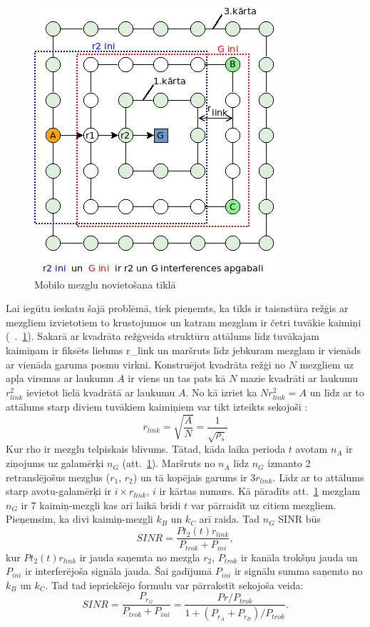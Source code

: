 \begin{figure}[ht!]
 \centering
\includegraphics[scale=0.6]{./graph/tier.png}
\caption{Mobilo mezglu novietošana tīklā}
\label{fig:topo}
\end{figure}

Lai iegūtu ieskatu šajā problēmā, tiek pieņemts, ka tīkls ir taisnstūra režģis ar mezgliem izvietotiem to krustojumos un katram mezglam ir četri tuvākie kaimiņi (\seename~\figurename.~\ref{fig:topo}). Sakarā ar kvadrāta režģveida struktūru attālums līdz tuvākajam kaimiņam  ir fiksēts lielums \gls{r_link}  un maršruts līdz jebkuram mezglam ir vienāds ar vienāda garuma posmu virkni. Konstruējot kvadrāta režģi no $N$ mezgliem uz apļa virsmas ar laukumu $A$ ir viens un tas pats kā $N$ mazie kvadrāti ar laukumu $r_{link}^{2}$ ievietot lielā kvadrātā  ar laukumu $A$. No kā izriet ka $Nr_{link}^{2} = A$ un līdz ar to attālums starp diviem tuvākiem kaimiņiem var tikt izteikts sekojoši \cite{qoS_mobility}:
\begin{equation}
r_{link}=\sqrt{\frac{A}{N}}=\frac{1}{\sqrt{\rho_{s}}}
\label{eq:rlink}
\end{equation}
Kur \gls{rho} ir mezglu telpiskais blīvums. Tātad, kāda laika perioda $t$ avotam $n_{A}$ ir ziņojums uz galamērķi $n_{G}$ (att.~\ref{fig:topo}). Maršruts no $n_{A}$ līdz $n_{G}$ izmanto 2 retranslējošus mezglus ($r_{1}$, $r_{2}$) un tā kopējais garums ir 3$r_{link}$. Līdz ar to attālums starp avotu-galamērķi ir $i\times r_{link}$, $i$ ir kārtas numurs. Kā pāradīts att.~\ref{fig:topo} mezglam $n_{G}$ ir 7 kaimiņ-mezgli kas arī laikā brīdi $t$ var pārraidīt uz citiem mezgliem. Pieņemsim, ka divi kaimiņ-mezgli $k_{B}$ un $k_{C}$ arī raida. Tad $n_{G}$ SINR būs
\begin{equation}
SINR=\frac{Pt_{2}(t)r_{link}}{P_{trok}+P_{ini}},
\end{equation}
kur $Pt_{2}(t)r_{link}$ ir jauda saņemta no mezgla $r_{2}$, $P_{trok}$ ir kanāla trokšņu jauda un $P_{ini}$ ir interferējoša signāla jauda. Šai gadījumā $P_{ini}$ ir signālu summa saņemto no $k_{B}$ un $k_{C}$. Tad tad iepriekšējo formulu var pārrakstīt sekojoša veida:
\begin{equation}
SINR=\frac{P_{r_{G}}}{P_{trok}+P_{ini}}=\frac{Pr/P_{trok}}{1+(P_{r_{A}}+P_{r_{B}})/P_{trok}}.
\end{equation}


